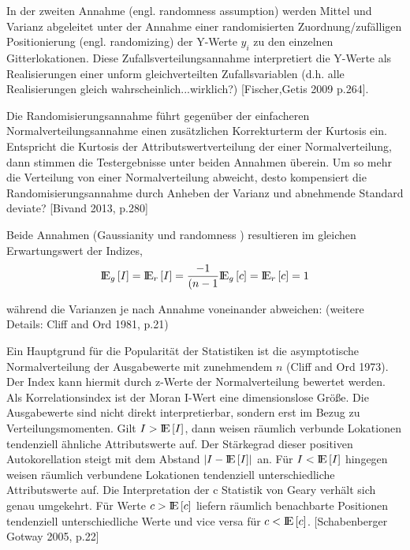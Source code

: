 In der zweiten Annahme (engl. randomness assumption) werden Mittel und Varianz abgeleitet unter der Annahme 
einer randomisierten Zuordnung/zufälligen Positionierung (engl. randomizing) der Y-Werte $y_i$ zu den einzelnen Gitterlokationen.
Diese Zufallsverteilungsannahme interpretiert die Y-Werte als Realisierungen einer unform gleichverteilten Zufallsvariablen 
(d.h. alle Realisierungen gleich wahrscheinlich...wirklich?) [Fischer,Getis 2009 p.264].

Die Randomisierungsannahme führt gegenüber der einfacheren Normalverteilungsannahme einen zusätzlichen Korrekturterm der Kurtosis ein. 
Entspricht die Kurtosis der Attributswertverteilung der einer Normalverteilung, dann stimmen die Testergebnisse unter beiden Annahmen überein. 
Um so mehr die Verteilung von einer Normalverteilung abweicht, desto kompensiert die Randomisierungsannahme durch Anheben der Varianz 
und abnehmende Standard deviate? [Bivand 2013, p.280]

Beide Annahmen (\glqq Gaussianity \grqq{} und \glqq randomness \grqq{}) resultieren im gleichen Erwartungswert der Indizes,
\begin{eqnarray}
    {\rm I\!E}_{g} \left[I \right]={\rm I\!E}_{r}\left[ I \right]=\frac{-1}{(n-1}
    {\rm I\!E}_{g} \left[c \right]={\rm I\!E}_{r}\left[ c \right]=1
\end{eqnarray}

während die Varianzen je nach Annahme voneinander abweichen:
(weitere Details: Cliff and Ord 1981, p.21)

Ein Hauptgrund für die Popularität der Statistiken ist die asymptotische Normalverteilung der Ausgabewerte mit zunehmendem $n$ (Cliff and Ord 1973). 
Der Index kann hiermit durch z-Werte der Normalverteilung bewertet werden. 
Als Korrelationsindex ist der Moran I-Wert eine dimensionslose Größe. 
Die Ausgabewerte sind nicht direkt interpretierbar, sondern erst im Bezug zu Verteilungsmomenten. 
Gilt $I>{\rm I\!E}\left[I\right]$, dann weisen räumlich verbunde Lokationen tendenziell ähnliche Attributswerte auf. 
Der Stärkegrad dieser positiven Autokorellation steigt mit dem Abstand $\left| I-{\rm I\!E}\left[ I \right] \right|$ an. 
Für $I<{\rm I\!E}\left[ I \right]$ hingegen weisen räumlich verbundene Lokationen tendenziell unterschiedliche Attributswerte auf. 
Die Interpretation der c Statistik von Geary verhält sich genau umgekehrt. 
Für Werte $c>{\rm I\!E}\left[c\right]$ liefern räumlich benachbarte Positionen tendenziell unterschiedliche Werte 
und vice versa für $c<{\rm I\!E}\left[c\right]$. [Schabenberger Gotway 2005, p.22]

